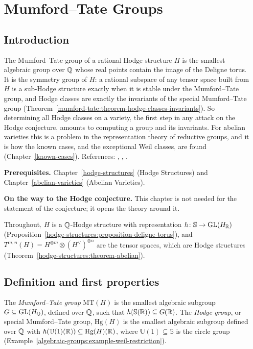 \chapter{Mumford--Tate Groups}\label{mumford-tate}

\section{Introduction}\label{mumford-tate:section-introduction}

The Mumford--Tate group of a rational Hodge structure $H$ is the smallest algebraic group over $\mathbb{Q}$ whose real points contain the image of the Deligne torus.
It is the symmetry group of $H$: a rational subspace of any tensor space built from $H$ is a sub-Hodge structure exactly when it is stable under the
Mumford--Tate group, and Hodge classes are exactly the invariants of the special Mumford--Tate group (Theorem~\ref{mumford-tate:theorem-hodge-classes-invariants}). So
determining all Hodge classes on a variety, the first step in any attack on the Hodge conjecture, amounts to computing a group and its invariants. For abelian varieties this is
a problem in the representation theory of reductive groups, and it is how the known cases, and the exceptional Weil classes, are found (Chapter~\ref{known-cases}). References:
\cite{deligne-abelian}, \cite{birkenhake-lange}, \cite{ggk-mumford-tate}.

\noindent\textbf{Prerequisites.} Chapter~\ref{hodge-structures} (Hodge Structures) and Chapter~\ref{abelian-varieties} (Abelian Varieties).

\noindent\textbf{On the way to the Hodge conjecture.} This chapter is not needed for the statement of the conjecture; it opens the theory around it.

Throughout, $H$ is a $\mathbb{Q}$-Hodge structure with representation $h \colon \mathbb{S} \to \mathrm{GL}(H_{\mathbb{R}})$ (Proposition~\ref{hodge-structures:proposition-deligne-torus}), and
$T^{m,n}(H) = H^{\otimes m} \otimes (H^\vee)^{\otimes n}$ are the tensor spaces, which are Hodge structures (Theorem~\ref{hodge-structures:theorem-abelian}).

\section{Definition and first properties}\label{mumford-tate:section-definition}

\begin{definition}\label{mumford-tate:definition-mumford-tate}
The \emph{Mumford--Tate group} $\mathrm{MT}(H)$ is the smallest algebraic subgroup $G \subseteq \mathrm{GL}(H_{\mathbb{Q}})$, defined over $\mathbb{Q}$, such that $h(\mathbb{S}(\mathbb{R})) \subseteq G(\mathbb{R})$. The
\emph{Hodge group}, or special Mumford--Tate group, $\mathrm{Hg}(H)$ is the smallest algebraic subgroup defined over $\mathbb{Q}$ with $h(\mathbb{U}(1)(\mathbb{R})) \subseteq \mathrm{Hg}(H)(\mathbb{R})$, where
$\mathbb{U}(1) \subseteq \mathbb{S}$ is the circle group (Example~\ref{algebraic-groups:example-weil-restriction}).
\end{definition}

